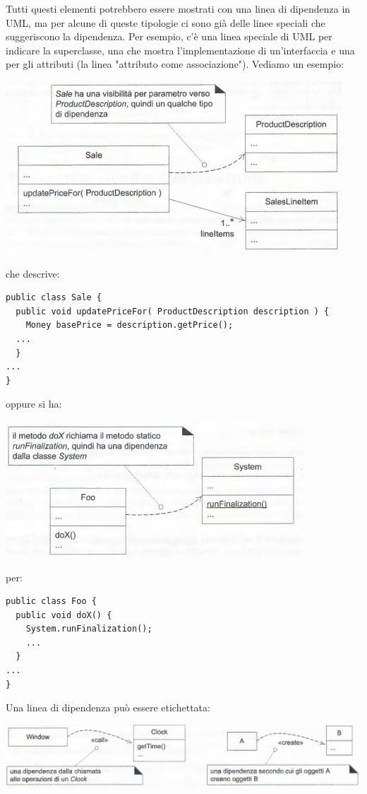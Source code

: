 \documentclass[a4paper,12pt, oneside]{book}
\begin{document}
Tutti questi elementi potrebbero essere mostrati con una linea di dipendenza in UML, ma per alcune di queste tipologie ci sono già delle linee speciali che suggeriscono la dipendenza. Per esempio, c'è una linea speciale di UML per indicare la superclasse, una che mostra l'implementazione di un'interfaccia e una per gli attributi (la linea "attributo
come associazione"). Vediamo un esempio:
\begin{center}
	\includegraphics[scale=0.7]{img/clasd11.png}
\end{center}
che descrive:
\begin{verbatim}
public class Sale {
  public void updatePriceFor( ProductDescription description ) {
    Money basePrice = description.getPrice();
  ...
  }
...
}
\end{verbatim}
oppure si ha:
\begin{center}
	\includegraphics[scale=0.7]{img/clasd12.png}
\end{center}
per:
\begin{verbatim}
public class Foo {
  public void doX() {
    System.runFinalization();
    ...
  }
...
}
\end{verbatim}
Una linea di dipendenza può essere etichettata:
\begin{center}
	\includegraphics[scale=0.7]{img/classd13.png}
\end{center}
\end{document}
